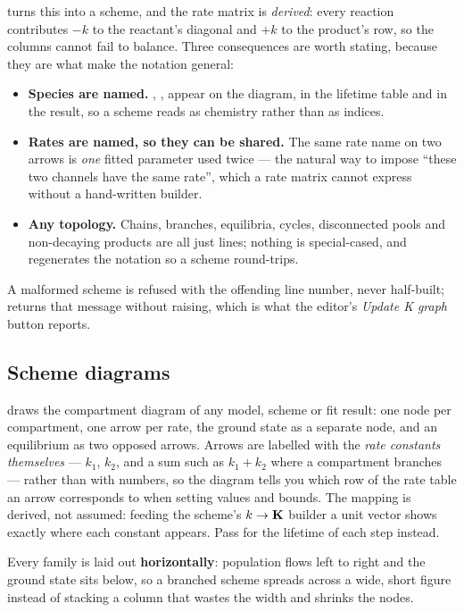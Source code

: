  turns this into a scheme, and the rate matrix
is \emph{derived}: every reaction contributes $-k$ to the reactant's diagonal
and $+k$ to the product's row, so the columns cannot fail to balance. Three
consequences are worth stating, because they are what make the notation
general:

\begin{itemize}
  \item \textbf{Species are named.} , ,  appear on
    the diagram, in the lifetime table and in the result, so a scheme reads as
    chemistry rather than as indices.
  \item \textbf{Rates are named, so they can be shared.} The same rate name on
    two arrows is \emph{one} fitted parameter used twice --- the natural way to
    impose ``these two channels have the same rate'', which a rate matrix
    cannot express without a hand-written builder.
  \item \textbf{Any topology.} Chains, branches, equilibria, cycles,
    disconnected pools and non-decaying products are all just lines; nothing is
    special-cased, and  regenerates the notation so a
    scheme round-trips.
\end{itemize}

A malformed scheme is refused with the offending line number, never
half-built;  returns that message without raising,
which is what the editor's \emph{Update K graph} button reports.

\subsection{Scheme diagrams}

 draws the compartment diagram of any model, scheme
or fit result: one node per compartment, one arrow per rate, the ground state
as a separate node, and an equilibrium as two opposed arrows. Arrows are
labelled with the \emph{rate constants themselves} --- $k_1$, $k_2$, and a sum
such as $k_1+k_2$ where a compartment branches --- rather than with numbers, so
the diagram tells you which row of the rate table an arrow corresponds to when
setting values and bounds. The mapping is derived, not assumed: feeding the
scheme's $k \rightarrow \mathbf{K}$ builder a unit vector shows exactly where each
constant appears. Pass  for the lifetime of each
step instead.

Every family is laid out \textbf{horizontally}: population flows left to right
and the ground state sits below, so a branched scheme spreads across a wide,
short figure instead of stacking a column that wastes the width and shrinks the
nodes.

